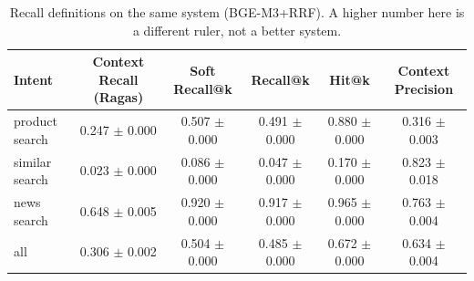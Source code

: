 \begin{table}[t]
\centering
\caption{Recall definitions on the same system (BGE-M3+RRF). A higher number here is a different ruler, not a better system.}
\label{tab:metrics}
\begin{tabular}{lccccc}
\toprule
Intent & Context Recall (Ragas) & Soft Recall@k & Recall@k & Hit@k & Context Precision \\
\midrule
product search & 0.247 $\pm$ 0.000 & 0.507 $\pm$ 0.000 & 0.491 $\pm$ 0.000 & 0.880 $\pm$ 0.000 & 0.316 $\pm$ 0.003 \\
similar search & 0.023 $\pm$ 0.000 & 0.086 $\pm$ 0.000 & 0.047 $\pm$ 0.000 & 0.170 $\pm$ 0.000 & 0.823 $\pm$ 0.018 \\
news search & 0.648 $\pm$ 0.005 & 0.920 $\pm$ 0.000 & 0.917 $\pm$ 0.000 & 0.965 $\pm$ 0.000 & 0.763 $\pm$ 0.004 \\
all & 0.306 $\pm$ 0.002 & 0.504 $\pm$ 0.000 & 0.485 $\pm$ 0.000 & 0.672 $\pm$ 0.000 & 0.634 $\pm$ 0.004 \\
\bottomrule
\end{tabular}
\end{table}